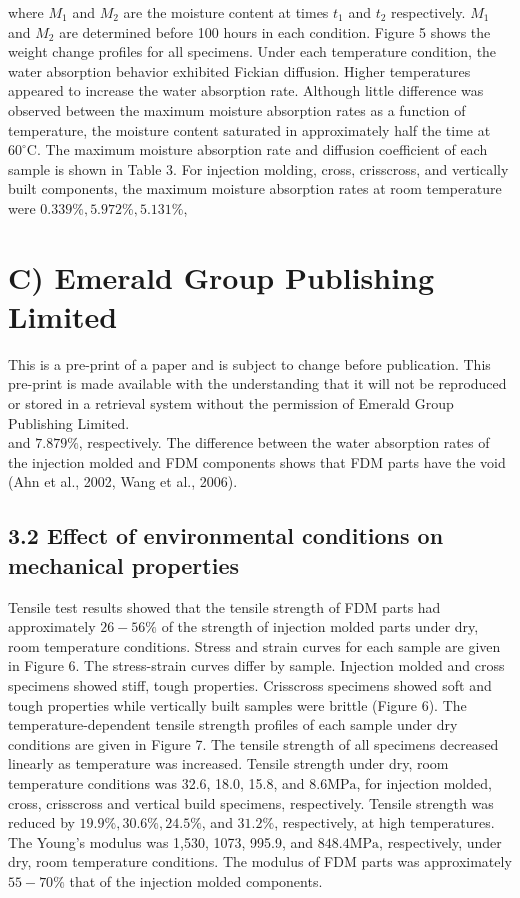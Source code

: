 \documentclass[10pt]{article}
\begin{document}
where $M_{1}$ and $M_{2}$ are the moisture content at times $t_{1}$ and $t_{2}$ respectively. $M_{1}$ and $M_{2}$ are determined before 100 hours in each condition. Figure 5 shows the weight change profiles for all specimens. Under each temperature condition, the water absorption behavior exhibited Fickian diffusion. Higher temperatures appeared to increase the water absorption rate. Although little difference was observed between the maximum moisture absorption rates as a function of temperature, the moisture content saturated in approximately half the time at $60^{\circ} \mathrm{C}$. The maximum moisture absorption rate and diffusion coefficient of each sample is shown in Table 3. For injection molding, cross, crisscross, and vertically built components, the maximum moisture absorption rates at room temperature were $0.339 \%, 5.972 \%, 5.131 \%$,

\section*{C) Emerald Group Publishing Limited}
This is a pre-print of a paper and is subject to change before publication. This pre-print is made available with the understanding that it will not be reproduced or stored in a retrieval system without the permission of Emerald Group Publishing Limited.\\
and $7.879 \%$, respectively. The difference between the water absorption rates of the injection molded and FDM components shows that FDM parts have the void (Ahn et al., 2002, Wang et al., 2006).

\subsection*{3.2 Effect of environmental conditions on mechanical properties}
Tensile test results showed that the tensile strength of FDM parts had approximately $26-56 \%$ of the strength of injection molded parts under dry, room temperature conditions. Stress and strain curves for each sample are given in Figure 6. The stress-strain curves differ by sample. Injection molded and cross specimens showed stiff, tough properties. Crisscross specimens showed soft and tough properties while vertically built samples were brittle (Figure 6). The temperature-dependent tensile strength profiles of each sample under dry conditions are given in Figure 7. The tensile strength of all specimens decreased linearly as temperature was increased. Tensile strength under dry, room temperature conditions was 32.6, 18.0, 15.8, and $8.6 \mathrm{MPa}$, for injection molded, cross, crisscross and vertical build specimens, respectively. Tensile strength was reduced by $19.9 \%, 30.6 \%, 24.5 \%$, and $31.2 \%$, respectively, at high temperatures. The Young's modulus was 1,530, 1073, 995.9, and $848.4 \mathrm{MPa}$, respectively, under dry, room temperature conditions. The modulus of FDM parts was approximately $55-70 \%$ that of the injection molded components.
\end{document}
